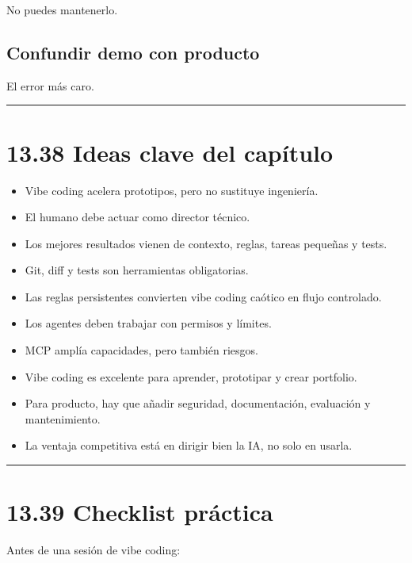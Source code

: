 No puedes mantenerlo.

\subsection{Confundir demo con
producto}\label{confundir-demo-con-producto}

El error más caro.

\begin{center}\rule{0.5\linewidth}{0.5pt}\end{center}

\section{13.38 Ideas clave del
capítulo}\label{ideas-clave-del-capuxedtulo-12}

\begin{itemize}
\tightlist
\item
  Vibe coding acelera prototipos, pero no sustituye ingeniería.
\item
  El humano debe actuar como director técnico.
\item
  Los mejores resultados vienen de contexto, reglas, tareas pequeñas y
  tests.
\item
  Git, diff y tests son herramientas obligatorias.
\item
  Las reglas persistentes convierten vibe coding caótico en flujo
  controlado.
\item
  Los agentes deben trabajar con permisos y límites.
\item
  MCP amplía capacidades, pero también riesgos.
\item
  Vibe coding es excelente para aprender, prototipar y crear portfolio.
\item
  Para producto, hay que añadir seguridad, documentación, evaluación y
  mantenimiento.
\item
  La ventaja competitiva está en dirigir bien la IA, no solo en usarla.
\end{itemize}

\begin{center}\rule{0.5\linewidth}{0.5pt}\end{center}

\section{13.39 Checklist práctica}\label{checklist-pruxe1ctica-12}

Antes de una sesión de vibe coding:

